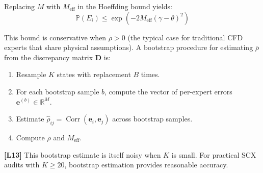 \documentclass[11pt,a4paper]{article}
\theoremstyle{definition}
\theoremstyle{remark}
\newcommand{\limitationTag}[1]{\textsf{\textbf{[L#1]}}}
\DeclareMathOperator{\Corr}{Corr}
\newcommand{\R}{\mathbb{R}}
\newcommand{\Pbb}{\mathbb{P}}
\begin{document}
Replacing $M$ with $M_{\text{eff}}$ in the Hoeffding bound yields:
\begin{equation}
\Pbb(E_i) \leq \exp\left( -2 M_{\text{eff}} (\gamma - \theta)^2 \right)
\label{eq:noise_corr}
\end{equation}

\noindent This bound is conservative when $\bar{\rho} > 0$ (the typical case for traditional CFD experts that share physical assumptions).
A bootstrap procedure for estimating $\bar{\rho}$ from the discrepancy matrix $\mathbf{D}$ is:

\begin{enumerate}[label=(\roman*)]
    \item Resample $K$ states with replacement $B$ times.
    \item For each bootstrap sample $b$, compute the vector of per-expert errors $\mathbf{e}^{(b)} \in \R^M$.
    \item Estimate $\hat{\rho}_{ij} = \Corr(\mathbf{e}_i, \mathbf{e}_j)$ across bootstrap samples.
    \item Compute $\bar{\rho}$ and $M_{\text{eff}}$.
\end{enumerate}

\noindent \limitationTag{13} This bootstrap estimate is itself noisy when $K$ is small. For practical SCX audits with $K \geq 20$, bootstrap estimation provides reasonable accuracy.
\end{document}
